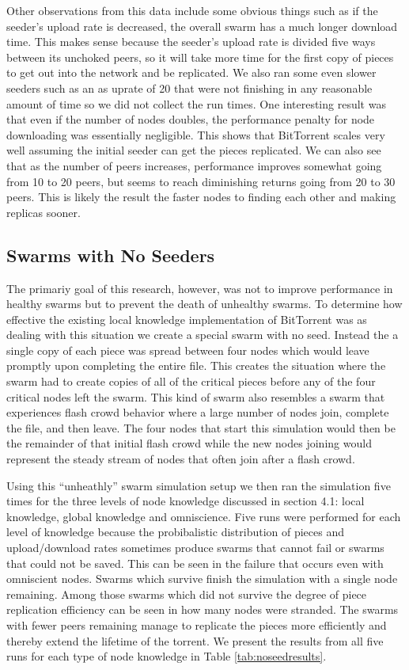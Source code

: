 Other observations from this data include some obvious things such as
if the seeder's upload rate is decreased, the overall swarm has a much
longer download time. This makes sense because the seeder's upload rate
is divided five ways between its unchoked peers, so it will take more
time for the first copy of pieces to get out into the network and be
replicated. We also ran some even slower seeders such as an as uprate
of 20 that were not finishing in any reasonable amount of time so we
did not collect the run times. One interesting result was that even if
the number of nodes doubles, the performance penalty for node downloading
was essentially negligible. This shows that BitTorrent scales very well
assuming the initial seeder can get the pieces replicated.  We can also
see that as the number of peers increases, performance improves somewhat
going from 10 to 20 peers, but seems to reach diminishing returns going
from 20 to 30 peers. This is likely the result the faster nodes to
finding each other and making replicas sooner.



\subsection{Swarms with No Seeders}

The primariy goal of this research, however, was not to improve
performance in healthy swarms but to prevent the death of unhealthy
swarms. To determine how effective the existing local knowledge
implementation of BitTorrent was as dealing with this situation we
create a special swarm with no seed. Instead the a single copy of
each piece was spread between four nodes which would leave promptly
upon completing the entire file. This creates the situation where the
swarm had to create copies of all of the critical pieces before any of
the four critical nodes left the swarm. This kind of swarm also
resembles a swarm that experiences flash crowd behavior where a
large number of nodes join, complete the file, and then leave. The
four nodes that start this simulation would then be the remainder of
that initial flash crowd while the new nodes joining would represent
the steady stream of nodes that often join after a flash crowd. 

Using this ``unheathly'' swarm simulation setup we then ran the
simulation five times for the three levels of node knowledge discussed
in section 4.1: local knowledge, global knowledge and
omniscience. Five runs were performed for each level of knowledge
because the probibalistic distribution of pieces and upload/download
rates sometimes produce swarms that cannot fail or swarms that
could not be saved. This can be seen in the failure that occurs even
with omniscient nodes. Swarms which survive finish the simulation
with a single node remaining. Among those swarms which did not survive
the degree of piece replication efficiency can be seen in how many
nodes were stranded. The swarms with fewer peers remaining manage to
replicate the pieces more efficiently and thereby extend the
lifetime of the torrent. We present the results from all five runs for each type
of node knowledge in Table \ref{tab:noseedresults}.

